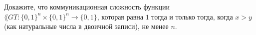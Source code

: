 Докажите, что коммуникационная сложность функции $\lang{GT}: \{0, 1\}^n \times \{0, 1\}^n \rightarrow \{0, 1\}$, которая
равна $1$ тогда и только тогда, когда $x > y$ (как натуральные числа в двоичной записи), не менее $n$.